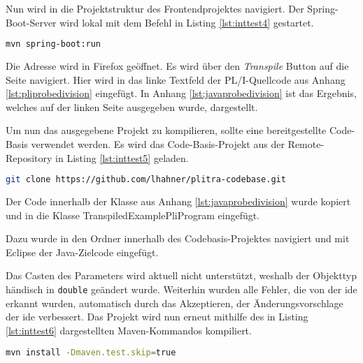 Nun wird in die Projektstruktur des Frontendprojektes navigiert. Der Spring-Boot-Server wird lokal mit dem Befehl in Listing \ref{lst:inttest4} gestartet.

\begin{lstlisting}[language=Bash, caption=Starten des Spring-Boot-Servers, label={lst:inttest4}]
mvn spring-boot:run
\end{lstlisting}

Die Adresse  wird in Firefox geöffnet. Es wird über den \emph{Transpile} Button auf die Seite  navigiert. Hier wird in das linke Textfeld der PL/I-Quellcode aus Anhang \ref{lst:pliprobedivision} eingefügt. In Anhang \ref{lst:javaprobedivision} ist das Ergebnis, welches auf der linken Seite ausgegeben wurde, dargestellt.

Um nun das ausgegebene Projekt zu kompilieren, sollte eine bereitgestellte Code-Basis verwendet werden. Es wird das Code-Basis-Projekt aus der Remote-Repository in Listing \ref{lst:inttest5} geladen.

\begin{lstlisting}[language=Bash, caption=Klonen der Codebasis, label={lst:inttest5}]
git clone https://github.com/lhahner/plitra-codebase.git
\end{lstlisting}

Der Code innerhalb der Klasse aus Anhang \ref{lst:javaprobedivision} wurde kopiert und in die Klasse TranspiledExamplePliProgram eingefügt. 

Dazu wurde in den Ordner  innerhalb des Codebasis-Projektes navigiert und mit Eclipse der Java-Zielcode eingefügt.

Das Casten des Parameters wird aktuell nicht unterstützt, weshalb der Objekttyp händisch
in \verb+double+ geändert wurde. Weiterhin wurden alle Fehler, die von der \ac{ide} erkannt wurden, automatisch durch das Akzeptieren, der Änderungsvorschlage der  \ac{ide}  verbessert.
Das Projekt wird nun erneut mithilfe des in Listing \ref{lst:inttest6} dargestellten Maven-Kommandos kompiliert.

\begin{lstlisting}[language=Bash, caption=Kompilieren des Projekts, label={lst:inttest6}]
mvn install -Dmaven.test.skip=true
\end{lstlisting}

